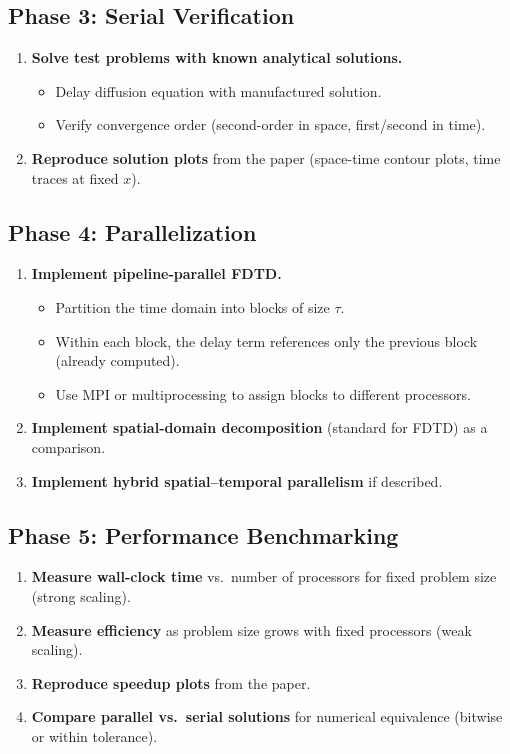 \documentclass[11pt,a4paper]{article}
\begin{document}
\subsection{Phase 3: Serial Verification}
\begin{enumerate}[label=\textbf{3.\arabic*}]
  \item \textbf{Solve test problems with known analytical solutions.}
    \begin{itemize}
      \item Delay diffusion equation with manufactured solution.
      \item Verify convergence order (second-order in space, first/second in time).
    \end{itemize}
  \item \textbf{Reproduce solution plots} from the paper (space-time contour plots, time traces at fixed $x$).
\end{enumerate}

\subsection{Phase 4: Parallelization}
\begin{enumerate}[label=\textbf{4.\arabic*}]
  \item \textbf{Implement pipeline-parallel FDTD.}
    \begin{itemize}
      \item Partition the time domain into blocks of size $\tau$.
      \item Within each block, the delay term references only the previous block (already computed).
      \item Use MPI or multiprocessing to assign blocks to different processors.
    \end{itemize}
  \item \textbf{Implement spatial-domain decomposition} (standard for FDTD) as a comparison.
  \item \textbf{Implement hybrid spatial--temporal parallelism} if described.
\end{enumerate}

\subsection{Phase 5: Performance Benchmarking}
\begin{enumerate}[label=\textbf{5.\arabic*}]
  \item \textbf{Measure wall-clock time} vs.\ number of processors for fixed problem size (strong scaling).
  \item \textbf{Measure efficiency} as problem size grows with fixed processors (weak scaling).
  \item \textbf{Reproduce speedup plots} from the paper.
  \item \textbf{Compare parallel vs.\ serial solutions} for numerical equivalence (bitwise or within tolerance).
\end{enumerate}
\end{document}
